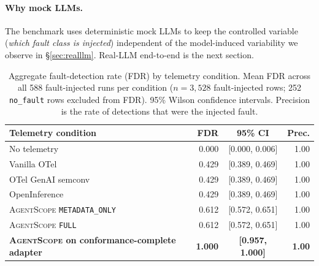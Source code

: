 \documentclass[sigplan,10pt,anonymous,review]{acmart}
\newcommand{\sysname}{\textsc{AgentScope}\xspace}
\begin{document}
\paragraph{Why mock LLMs.} The benchmark uses deterministic mock LLMs
to keep the controlled variable (\emph{which fault class is injected})
independent of the model-induced variability we observe in
\S\ref{sec:realllm}. Real-LLM end-to-end is the next section.

\begin{table}[t]
\centering
\small
\caption{Aggregate fault-detection rate (FDR) by telemetry condition.
Mean FDR across all 588 fault-injected runs per condition
($n=3{,}528$ fault-injected rows; 252 \texttt{no\_fault} rows excluded
from FDR). 95\% Wilson confidence intervals. Precision is the rate of
detections that were the injected fault.}
\label{tab:fdr}
\begin{tabular}{@{}lrcr@{}}
\toprule
\textbf{Telemetry condition} & \textbf{FDR} & \textbf{95\% CI} & \textbf{Prec.} \\
\midrule
No telemetry                 & 0.000 & [0.000, 0.006] & 1.00 \\
Vanilla OTel                 & 0.429 & [0.389, 0.469] & 1.00 \\
OTel GenAI semconv           & 0.429 & [0.389, 0.469] & 1.00 \\
OpenInference                & 0.429 & [0.389, 0.469] & 1.00 \\
\sysname{} \texttt{METADATA\_ONLY} & 0.612 & [0.572, 0.651] & 1.00 \\
\sysname{} \texttt{FULL}           & 0.612 & [0.572, 0.651] & 1.00 \\
\midrule
\textbf{\sysname{} on conformance-complete adapter}
  & \textbf{1.000} & \textbf{[0.957, 1.000]} & \textbf{1.00} \\
\bottomrule
\end{tabular}
\end{table}
\end{document}
